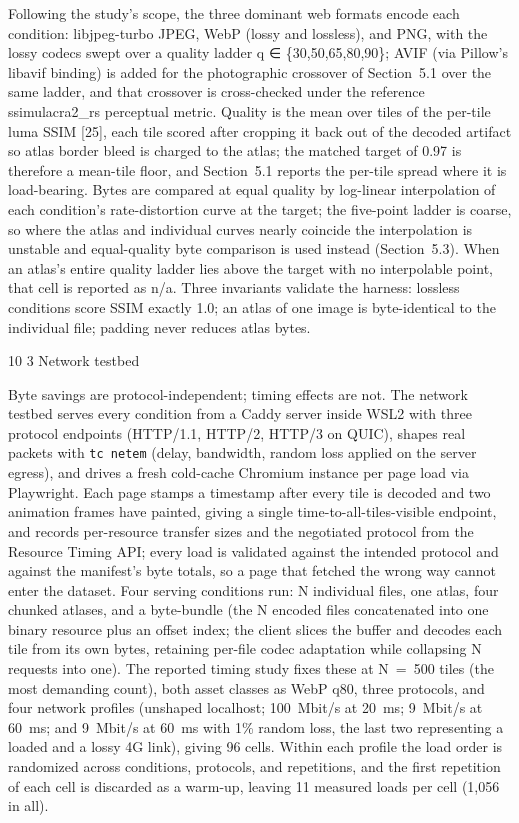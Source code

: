 \documentclass[3p,twocolumn]{elsarticle}
\makeatletter
\renewcommand\subsection{\@startsection{subsection}{2}{\z@}%
           {10\p@ \@plus 3\p@ \@minus 3\p@}%
           {3\p@ \@plus 2\p@ \@minus 1\p@}%
           {\normalfont\normalsize\itshape}}
\makeatother
\begin{document}
Following the study's scope, the three dominant web
formats encode each condition: libjpeg-turbo JPEG, WebP (lossy and
lossless), and PNG, with the lossy codecs swept over a quality ladder q
∈ \{30,50,65,80,90\}; AVIF (via Pillow's libavif
binding) is added for the photographic crossover of Section~5.1 over the
same ladder, and that crossover is cross-checked under the reference
ssimulacra2\_rs perceptual metric. Quality is the mean over tiles of the
per-tile luma SSIM [25], each tile scored after cropping it back out
of the decoded artifact so atlas border bleed is charged to the atlas;
the matched target of 0.97 is therefore a mean-tile floor, and
Section~5.1 reports the per-tile spread where it is load-bearing. Bytes
are compared at equal quality by log-linear interpolation of each
condition's rate-distortion curve at the target; the
five-point ladder is coarse, so where the atlas and individual curves
nearly coincide the interpolation is unstable and equal-quality byte
comparison is used instead (Section~5.3). When an
atlas's entire quality ladder lies above the target with
no interpolable point, that cell is reported as n/a. Three invariants
validate the harness: lossless conditions score SSIM exactly 1.0; an
atlas of one image is byte-identical to the individual file; padding
never reduces atlas bytes.

\subsection{Network testbed}

Byte savings are protocol-independent; timing effects are not. The
network testbed serves every condition from a Caddy server inside WSL2
with three protocol endpoints (HTTP/1.1, HTTP/2, HTTP/3 on QUIC), shapes
real packets with \texttt{tc\ netem} (delay, bandwidth, random loss
applied on the server egress), and drives a fresh cold-cache Chromium
instance per page load via Playwright. Each page stamps a timestamp
after every tile is decoded and two animation frames have painted,
giving a single time-to-all-tiles-visible endpoint, and records
per-resource transfer sizes and the negotiated protocol from the
Resource Timing API; every load is validated against the intended
protocol and against the manifest's byte totals, so a
page that fetched the wrong way cannot enter the dataset. Four serving
conditions run: N individual files, one atlas, four chunked atlases, and
a byte-bundle (the N encoded files concatenated into one binary resource
plus an offset index; the client slices the buffer and decodes each tile
from its own bytes, retaining per-file codec adaptation while collapsing
N requests into one). The reported timing study fixes these at N~=~500
tiles (the most demanding count), both asset classes as WebP q80, three
protocols, and four network profiles (unshaped localhost; 100~Mbit/s at
20~ms; 9~Mbit/s at 60~ms; and 9~Mbit/s at 60~ms with 1\% random loss,
the last two representing a loaded and a lossy 4G link), giving 96
cells. Within each profile the load order is randomized across
conditions, protocols, and repetitions, and the first repetition of each
cell is discarded as a warm-up, leaving 11 measured loads per cell
(1,056 in all).
\end{document}
